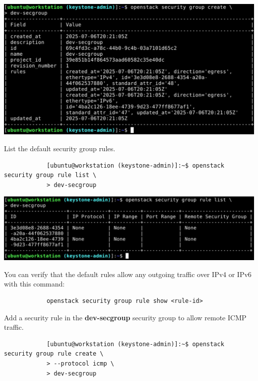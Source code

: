 \documentclass[letterpaper, 12pt]{article}
\begin{document}
\begin{enumerate}
\begin{labstep}
        \begin{center}
            \includegraphics[width=\linewidth]{images/part1/step26.png}
        \end{center}
    \end{labstep}

    \begin{labstep}
        List the default security group rules.
        \begin{lstlisting}
            [ubuntu@workstation (keystone-admin)]:~$ openstack security group rule list \
            > dev-secgroup
        \end{lstlisting}

        \begin{center}
            \includegraphics[width=\linewidth]{images/part1/step27.png}
        \end{center}
    \end{labstep}

    \begin{tipbox}
        You can verify that the default rules allow any outgoing traffic over IPv4 or IPv6 with this command:
        \begin{lstlisting}
            openstack security group rule show <rule-id>
        \end{lstlisting}
    \end{tipbox}

    \begin{labstep}
        Add a security rule in the \textbf{dev-secgroup} security group to allow remote ICMP traffic.
        \begin{lstlisting}
            [ubuntu@workstation (keystone-admin)]:~$ openstack security group rule create \
            > --protocol icmp \
            > dev-secgroup
        \end{lstlisting}


\end{labstep}
\end{enumerate}
\end{document}
